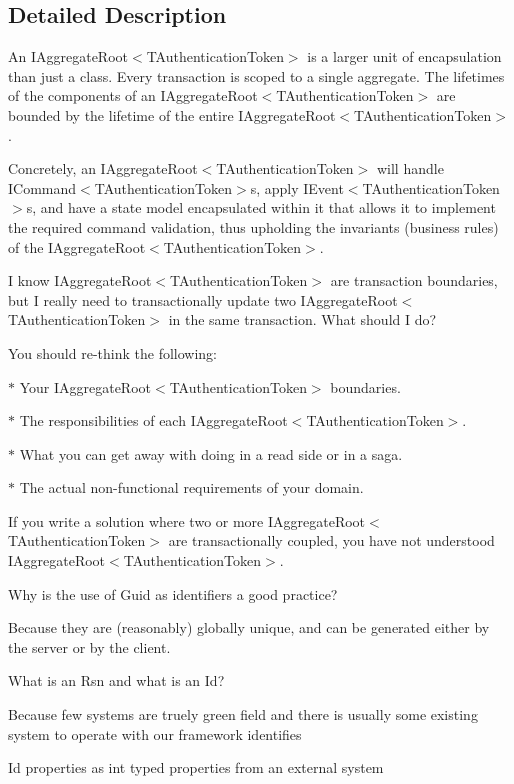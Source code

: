 \subsection{Detailed Description}
An I\+Aggregate\+Root$<$\+T\+Authentication\+Token$>$ is a larger unit of encapsulation than just a class. Every transaction is scoped to a single aggregate. The lifetimes of the components of an I\+Aggregate\+Root$<$\+T\+Authentication\+Token$>$ are bounded by the lifetime of the entire I\+Aggregate\+Root$<$\+T\+Authentication\+Token$>$. 

Concretely, an I\+Aggregate\+Root$<$\+T\+Authentication\+Token$>$ will handle I\+Command$<$\+T\+Authentication\+Token$>$s, apply I\+Event$<$\+T\+Authentication\+Token$>$s, and have a state model encapsulated within it that allows it to implement the required command validation, thus upholding the invariants (business rules) of the I\+Aggregate\+Root$<$\+T\+Authentication\+Token$>$. 

I know I\+Aggregate\+Root$<$\+T\+Authentication\+Token$>$ are transaction boundaries, but I really need to transactionally update two I\+Aggregate\+Root$<$\+T\+Authentication\+Token$>$ in the same transaction. What should I do?

You should re-\/think the following\+: 

$\ast$ Your I\+Aggregate\+Root$<$\+T\+Authentication\+Token$>$ boundaries. 

$\ast$ The responsibilities of each I\+Aggregate\+Root$<$\+T\+Authentication\+Token$>$. 

$\ast$ What you can get away with doing in a read side or in a saga. 

$\ast$ The actual non-\/functional requirements of your domain. 

If you write a solution where two or more I\+Aggregate\+Root$<$\+T\+Authentication\+Token$>$ are transactionally coupled, you have not understood I\+Aggregate\+Root$<$\+T\+Authentication\+Token$>$. 

Why is the use of Guid as identifiers a good practice? 

Because they are (reasonably) globally unique, and can be generated either by the server or by the client. 

What is an Rsn and what is an Id? 

Because few systems are truely green field and there is usually some existing system to operate with our framework identifies 

Id properties as int typed properties from an external system 

